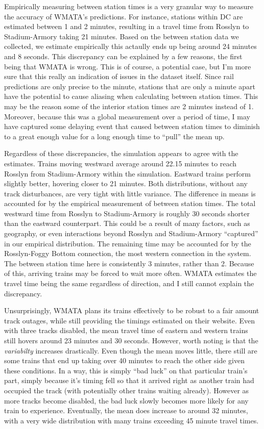 \documentclass[a4paper,12pt]{article}
\begin{document}
Empirically measuring between station times is a very granular way to measure the accuracy of WMATA's predictions. For
instance, stations within DC are estimated between 1 and 2 minutes, resulting in a travel time from Rosslyn to
Stadium-Armory taking 21 minutes. Based on the between station data we collected, we estimate empirically this actaully
ends up being around 24 minutes and 8 seconds. This discrepancy can be explained by a few reasons, the first being that
WMATA is wrong. This is of course, a potential case, but I'm more sure that this really an indication of issues in the
dataset itself. Since rail predictions are only precise to the minute, stations that are only a minute apart have the
potential to cause aliasing when calculating between station times. This may be the reason some of the interior station
times are 2 minutes instead of 1. Moreover, because this was a global measurement over a period of time, I may have 
captured some delaying event that caused between station times to diminish to a great enough value for a long enough
time to ``pull'' the mean up.

Regardless of these discrepancies, the simulation appears to agree with the estimates. Trains moving westward average
around 22.15 minutes to reach Rosslyn from Stadium-Armory within the simulation. Eastward trains perform slightly
better, hovering closer to 21 minutes. Both distributions, without any track disturbances, are very tight with little
variance. The difference in  means is accounted for by the empirical measurement of between station times. The total
westward time from Rosslyn to  Stadium-Armory is roughly 30 seconds shorter than the eastward counterpart. This could
be a result of many factors, such as geography, or even interactions beyond Rosslyn and Stadium-Armory ``captured''
in our empirical distribution. The remaining time may be accounted for by the Rosslyn-Foggy Bottom connection, the
most western connection in the system. The between station time here is  consistently 3 minutes, rather than 2.
Because of this, arriving trains may be forced to wait more often. WMATA estimates the travel time being the same
regardless of direction, and I still cannot explain the discrepancy.

Unsurprisingly, WMATA plans its trains effectively to be robust to a fair amount track outages, while still providing
the timings estimated on their website. Even with three tracks disabled, the mean travel time of eastern and western
trains still hovers around 23 minutes and 30 seconds. However, worth noting is that the \emph{variabilty} increases
drastically. Even though the mean moves little, there still are some trains that end up taking over 40 minutes to
reach the other side given these conditions. In a way, this is simply ``bad luck'' on that particular train's part,
simply because it's timing fell so that it arrived right as another train had occupied the track (with potentially
other trains waiting already). However as more tracks become disabled, the bad luck slowly becomes more likely for any
train to experience. Eventually, the mean does increase to around 32 minutes, with a very wide distribution with many
trains exceeding 45 minute travel times.
\end{document}

